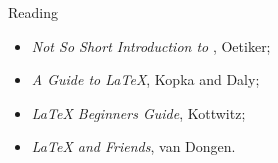 \begin{frame}{Reading}

  \begin{itemize}
    \item \emph{Not So Short Introduction to \LaTeXe{}}, Oetiker;
    \item \emph{A Guide to \LaTeX{}}, Kopka and Daly;
    \item \emph{\LaTeX{} Beginners Guide}, Kottwitz;
    \item \emph{\LaTeX{} and Friends}, van Dongen.
  \end{itemize}

\end{frame}




